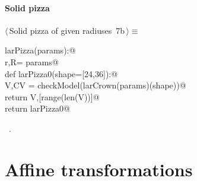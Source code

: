 \documentclass[11pt,oneside]{article}	%
\begin{document}
\paragraph{Solid pizza}
\begin{flushleft} \small \label{scrap16}
\protect{}$\langle\,$Solid pizza of given radiuses\nobreak\ {\footnotesize 7b}$\,\rangle\equiv$
\vspace{-1ex}
\begin{list}{}{} \item
\mbox{}\verb@def larPizza(params):@\\
\mbox{}\verb@   r,R= params@\\
\mbox{}\verb@   def larPizza0(shape=[24,36]):@\\
\mbox{}\verb@      V,CV = checkModel(larCrown(params)(shape))@\\
\mbox{}\verb@      return V,[range(len(V))]@\\
\mbox{}\verb@   return larPizza0@\\
\mbox{}\verb@@{\NWsep}
\end{list}
\vspace{-1ex}
\footnotesize\addtolength{\baselineskip}{-1ex}
\begin{list}{}{\setlength{\itemsep}{-\parsep}\setlength{\itemindent}{-\leftmargin}}
\item \NWtxtMacroRefIn\ .
\end{list}
\end{flushleft}
\section{Affine transformations}
\end{document}
